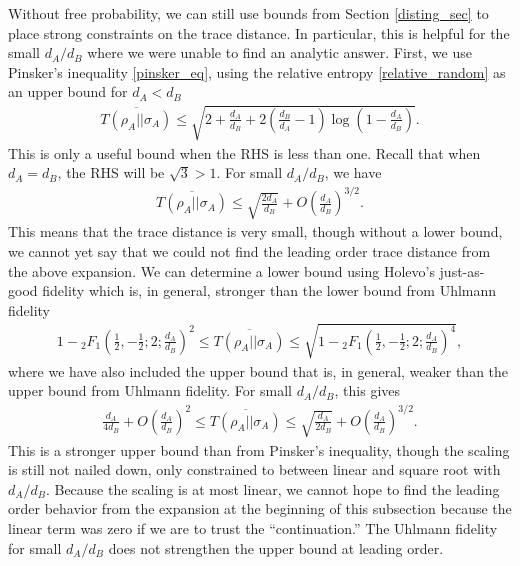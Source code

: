 \documentclass[a4paper,11pt]{article}
\begin{document}
Without free probability, we can still use bounds from Section \ref{disting_sec} to place strong constraints on the trace distance. In particular, this is helpful for the small $d_A/d_B$ where we were unable to find an analytic answer. First, we use Pinsker's inequality \eqref{pinsker_eq}, using the relative entropy \eqref{relative_random} as an upper bound for $d_A < d_B$
\begin{align}
    \overline{T({\rho_A} ||
    { \sigma_A})}
    \leq \sqrt{2+\frac{d_A}{ d_B}+2\left(\frac{d_B}{d_A}-1\right) \log
   \left(1-\frac{d_A}{d_B}\right)}.
\end{align}
This is only a useful bound when the RHS is less than one. Recall that when $d_A = d_B$, the RHS will be $\sqrt{3} > 1$. For small $d_A/d_B$, we have
\begin{align}
    \overline{T({\rho_A} ||
    {\sigma_A})}\leq \sqrt{\frac{2d_A}{d_B}} + O\left(\frac{d_A}{d_B} \right)^{3/2}.
\end{align}
This means that the trace distance is very small, though without a lower bound, we cannot yet say that we could not find the leading order trace distance from the above expansion. We can determine a lower bound using Holevo's just-as-good fidelity which is, in general, stronger than the lower bound from Uhlmann fidelity
\begin{align}
    1- {}_2F_1\left(\frac{1}{2},-\frac{1}{2};2;\frac{d_A}{d_B}\right)^2 \leq 
    \overline{T({\rho_A} || 
    {\sigma_A} )}\leq  \sqrt{1- {}_2F_1\left(\frac{1}{2},-\frac{1}{2};2;\frac{d_A}{d_B}\right)^4},
    \label{T_bound_smalldA}
\end{align}
where we have also included the upper bound that is, in general, weaker than the upper bound from Uhlmann fidelity.
For small $d_A/d_B$, this gives
\begin{align}
    \frac{d_A}{4d_B} + O\left(\frac{d_A}{d_B} \right)^2 \leq \overline{T(
    {
    \rho_A} 
    || 
    {
    \sigma_A})} \leq  \sqrt{\frac{d_A}{2d_B}}+ O\left(\frac{d_A}{d_B} \right)^{3/2}.
\end{align}
This is a stronger upper bound than from Pinsker's inequality, though the scaling is still not nailed down, only constrained to between linear and square root with $d_A/d_B$. Because the scaling is at most linear, we cannot hope to find the leading order behavior from the expansion at the beginning of this subsection because the linear term was zero if we are to trust the ``continuation.'' 
The Uhlmann fidelity for small $d_A/d_B$ does not strengthen the upper bound at leading order.
\end{document}
